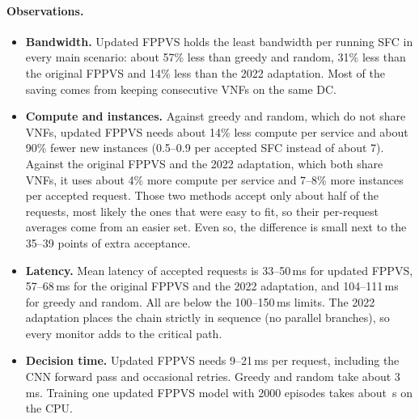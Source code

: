 \begin{table}[H]
\centering\small
\caption{Average reduction in resource use achieved by updated FPPVS over each
method (main scenarios; positive means updated FPPVS uses less, negative means
it uses more).}
\label{tab:savings}

\end{table}

\begin{table}[H]
\centering\scriptsize
\setlength{\tabcolsep}{4pt}
\caption{Resource use and latency per scenario (mean over seeds; best per
column within a scenario in bold). ``Per acc.'' means per accepted SFC.}
\label{tab:res}

\end{table}

\paragraph{Observations.}
\begin{itemize}
  \item \textbf{Bandwidth.} Updated FPPVS holds the least bandwidth per running
  SFC in every main scenario: about 57\% less than greedy and random, 31\% less
  than the original FPPVS and 14\% less than the 2022 adaptation. Most of the
  saving comes from keeping consecutive VNFs on the same DC.
  \item \textbf{Compute and instances.} Against greedy and random, which do not
  share VNFs, updated FPPVS needs about 14\% less compute per service and about
  90\% fewer new instances (0.5--0.9 per accepted SFC instead of about 7).
  Against the original FPPVS and the 2022 adaptation, which both share VNFs, it
  uses about 4\% more compute per service and 7--8\% more instances per accepted
  request. Those two methods accept only about half of the requests, most likely
  the ones that were easy to fit, so their per-request averages come from an
  easier set. Even so, the difference is small next to the 35--39 points of
  extra acceptance.
  \item \textbf{Latency.} Mean latency of accepted requests is 33--50\,ms for
  updated FPPVS, 57--68\,ms for the original FPPVS and the 2022 adaptation,
  and 104--111\,ms for greedy and random. All are below the 100--150\,ms limits.
  The 2022 adaptation places the chain strictly in sequence (no parallel
  branches), so every monitor adds to the critical path.
  \item \textbf{Decision time.} Updated FPPVS needs 9--21\,ms per request,
  including the CNN forward pass and occasional retries. Greedy and random take
  about 3\,ms. Training one updated FPPVS model with 2000 episodes takes about
  \trainSeconds\,s on the CPU.
\end{itemize}

